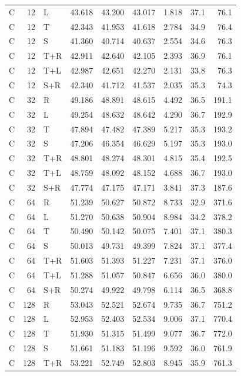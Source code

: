\begin{longtable}{@{}lrlrrrrrr@{}}
C & 12 & L & 43.618 & 43.200 & 43.017 & 1.818 & 37.1 & 76.1 \\
C & 12 & T & 42.343 & 41.953 & 41.618 & 2.784 & 34.9 & 76.4 \\
C & 12 & S & 41.360 & 40.714 & 40.637 & 2.554 & 34.6 & 76.3 \\
C & 12 & T+R & 42.911 & 42.640 & 42.105 & 2.393 & 36.9 & 76.1 \\
C & 12 & T+L & 42.987 & 42.651 & 42.270 & 2.131 & 33.8 & 76.3 \\
C & 12 & S+R & 42.340 & 41.712 & 41.537 & 2.035 & 35.3 & 74.3 \\
\addlinespace
C & 32 & R & 49.186 & 48.891 & 48.615 & 4.492 & 36.5 & 191.1 \\
C & 32 & L & 49.254 & 48.632 & 48.642 & 4.290 & 36.7 & 192.9 \\
C & 32 & T & 47.894 & 47.482 & 47.389 & 5.217 & 35.3 & 193.2 \\
C & 32 & S & 47.206 & 46.354 & 46.629 & 5.197 & 35.3 & 193.0 \\
C & 32 & T+R & 48.801 & 48.274 & 48.301 & 4.815 & 35.4 & 192.5 \\
C & 32 & T+L & 48.759 & 48.092 & 48.152 & 4.688 & 36.7 & 193.0 \\
C & 32 & S+R & 47.774 & 47.175 & 47.171 & 3.841 & 37.3 & 187.6 \\
\addlinespace
C & 64 & R & 51.239 & 50.627 & 50.872 & 8.733 & 32.9 & 371.6 \\
C & 64 & L & 51.270 & 50.638 & 50.904 & 8.984 & 34.2 & 378.2 \\
C & 64 & T & 50.490 & 50.142 & 50.075 & 7.401 & 37.1 & 380.3 \\
C & 64 & S & 50.013 & 49.731 & 49.399 & 7.824 & 37.1 & 377.4 \\
C & 64 & T+R & 51.603 & 51.393 & 51.227 & 7.231 & 37.1 & 376.0 \\
C & 64 & T+L & 51.288 & 51.057 & 50.847 & 6.656 & 36.0 & 380.0 \\
C & 64 & S+R & 50.274 & 49.922 & 49.798 & 6.114 & 36.5 & 368.8 \\
\addlinespace
C & 128 & R & 53.043 & 52.521 & 52.674 & 9.735 & 36.7 & 751.2 \\
C & 128 & L & 52.953 & 52.403 & 52.534 & 9.006 & 37.1 & 770.4 \\
C & 128 & T & 51.930 & 51.315 & 51.499 & 9.077 & 36.7 & 772.0 \\
C & 128 & S & 51.661 & 51.183 & 51.196 & 9.592 & 36.0 & 761.9 \\
C & 128 & T+R & 53.221 & 52.749 & 52.803 & 8.945 & 35.9 & 761.3 \\

\end{longtable}

